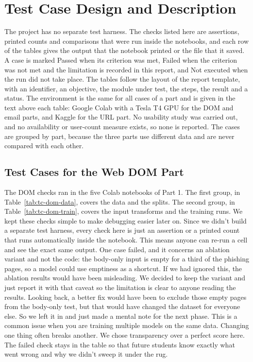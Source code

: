 \documentclass{FastFyp}
\begin{document}
\section{Test Case Design and Description}
\label{sec:test-design}
The project has no separate test harness. The checks listed here are assertions, printed counts and comparisons that were run inside the notebooks, and each row of the tables gives the output that the notebook printed or the file that it saved. A case is marked Passed when its criterion was met, Failed when the criterion was not met and the limitation is recorded in this report, and Not executed when the run did not take place. The tables follow the layout of the report template, with an identifier, an objective, the module under test, the steps, the result and a status. The environment is the same for all cases of a part and is given in the text above each table: Google Colab with a Tesla T4 GPU for the DOM and email parts, and Kaggle for the URL part. No usability study was carried out, and no availability or user-count measure exists, so none is reported. The cases are grouped by part, because the three parts use different data and are never compared with each other.


\subsection{Test Cases for the Web DOM Part}
\label{sec:test-dom}
The DOM checks ran in the five Colab notebooks of Part 1. The first group, in Table~\ref{tab:tc-dom-data}, covers the data and the splits. The second group, in Table~\ref{tab:tc-dom-train}, covers the input transforms and the training runs. We kept these checks simple to make debugging easier later on. Since we didn't build a separate test harness, every check here is just an assertion or a printed count that runs automatically inside the notebook. This means anyone can re-run a cell and see the exact same output. One case failed, and it concerns an ablation variant and not the code: the body-only input is empty for a third of the phishing pages, so a model could use emptiness as a shortcut. If we had ignored this, the ablation results would have been misleading. We decided to keep the variant and just report it with that caveat so the limitation is clear to anyone reading the results. Looking back, a better fix would have been to exclude those empty pages from the body-only test, but that would have changed the dataset for everyone else. So we left it in and just made a mental note for the next phase. This is a common issue when you are training multiple models on the same data. Changing one thing often breaks another. We chose transparency over a perfect score here. The failed check stays in the table so that future students know exactly what went wrong and why we didn't sweep it under the rug.
\end{document}
